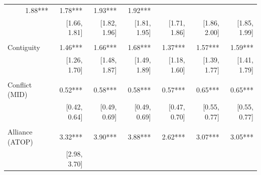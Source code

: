 \begin{table}[!h]
\begin{tabular}{lllllll}
  \multicolumn{1}{r}{1.88***} &
  \multicolumn{1}{r}{1.78***} &
  \multicolumn{1}{r}{1.93***} &
  \multicolumn{1}{r}{1.92***} \\
\multicolumn{1}{l}{} &
  \multicolumn{1}{|r}{[1.66,    1.81]} &
  \multicolumn{1}{r}{[1.82,    1.96]} &
  \multicolumn{1}{r}{[1.81,    1.95]} &
  \multicolumn{1}{r}{[1.71,    1.86]} &
  \multicolumn{1}{r}{[1.86,    2.00]} &
  \multicolumn{1}{r}{[1.85,    1.99]} \\
\multicolumn{1}{l}{} &
  \multicolumn{1}{|r}{} &
  \multicolumn{1}{r}{} &
  \multicolumn{1}{r}{} &
  \multicolumn{1}{r}{} &
  \multicolumn{1}{r}{} &
  \multicolumn{1}{r}{} \\
\multicolumn{1}{l}{Contiguity} &
  \multicolumn{1}{|r}{1.46***} &
  \multicolumn{1}{r}{1.66***} &
  \multicolumn{1}{r}{1.68***} &
  \multicolumn{1}{r}{1.37***} &
  \multicolumn{1}{r}{1.57***} &
  \multicolumn{1}{r}{1.59***} \\
\multicolumn{1}{l}{} &
  \multicolumn{1}{|r}{[1.26,    1.70]} &
  \multicolumn{1}{r}{[1.48,    1.87]} &
  \multicolumn{1}{r}{[1.49,    1.89]} &
  \multicolumn{1}{r}{[1.18,    1.60]} &
  \multicolumn{1}{r}{[1.39,    1.77]} &
  \multicolumn{1}{r}{[1.41,    1.79]} \\
\multicolumn{1}{l}{} &
  \multicolumn{1}{|r}{} &
  \multicolumn{1}{r}{} &
  \multicolumn{1}{r}{} &
  \multicolumn{1}{r}{} &
  \multicolumn{1}{r}{} &
  \multicolumn{1}{r}{} \\
\multicolumn{1}{l}{Conflict (MID)} &
  \multicolumn{1}{|r}{0.52***} &
  \multicolumn{1}{r}{0.58***} &
  \multicolumn{1}{r}{0.58***} &
  \multicolumn{1}{r}{0.57***} &
  \multicolumn{1}{r}{0.65***} &
  \multicolumn{1}{r}{0.65***} \\
\multicolumn{1}{l}{} &
  \multicolumn{1}{|r}{[0.42,    0.64]} &
  \multicolumn{1}{r}{[0.49,    0.69]} &
  \multicolumn{1}{r}{[0.49,    0.69]} &
  \multicolumn{1}{r}{[0.47,    0.70]} &
  \multicolumn{1}{r}{[0.55,    0.77]} &
  \multicolumn{1}{r}{[0.55,    0.77]} \\
\multicolumn{1}{l}{} &
  \multicolumn{1}{|r}{} &
  \multicolumn{1}{r}{} &
  \multicolumn{1}{r}{} &
  \multicolumn{1}{r}{} &
  \multicolumn{1}{r}{} &
  \multicolumn{1}{r}{} \\
\multicolumn{1}{l}{Alliance (ATOP)} &
  \multicolumn{1}{|r}{3.32***} &
  \multicolumn{1}{r}{3.90***} &
  \multicolumn{1}{r}{3.88***} &
  \multicolumn{1}{r}{2.62***} &
  \multicolumn{1}{r}{3.07***} &
  \multicolumn{1}{r}{3.05***} \\
\multicolumn{1}{l}{} &
  \multicolumn{1}{|r}{[2.98,    3.70]} &

\end{tabular}
\end{table}

